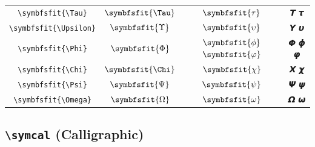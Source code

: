 \documentclass[12pt,a4paper]{article}
\begin{document}
\begin{longtable}{|c|c|c|c|}
\verb|\symbfsfit{\Tau}| & $\symbfsfit{\Tau}$ & $\symbfsfit{\tau}$ & 𝞣 𝞽 \\
\verb|\symbfsfit{\Upsilon}| & $\symbfsfit{\Upsilon}$ & $\symbfsfit{\upsilon}$ & 𝞤 𝞾 \\
\verb|\symbfsfit{\Phi}| & $\symbfsfit{\Phi}$ & $\symbfsfit{\phi}$ $\symbfsfit{\varphi}$ & 𝞥 𝟇 𝞿 \\
\verb|\symbfsfit{\Chi}| & $\symbfsfit{\Chi}$ & $\symbfsfit{\chi}$ & 𝞦 𝟀 \\
\verb|\symbfsfit{\Psi}| & $\symbfsfit{\Psi}$ & $\symbfsfit{\psi}$ & 𝞧 𝟁 \\
\verb|\symbfsfit{\Omega}| & $\symbfsfit{\Omega}$ & $\symbfsfit{\omega}$ & 𝞨 𝟂 \\
\hline
\end{longtable}

\newpage

\subsection*{\texttt{\textbackslash{}symcal} (Calligraphic)}
\end{document}
